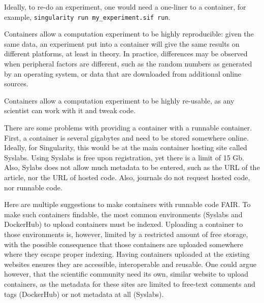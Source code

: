 Ideally, to re-do an experiment, one would need a one-liner to a container,
for example, \verb|singularity run my_experiment.sif run|.


Containers allow a computation experiment to be highly reproducible:
given the same data, an experiment put into a container will give
the same results on different platforms, at least in theory.
In practice, differences may be observed when peripheral factors
are different, such as the random numbers as generated by an operating
system, or data that are downloaded from additional online sources.


Containers allow a computation experiment to be highly re-usable,
as any scientist can work with it and tweak code.


There are some problems with providing a container with a runnable container.
First, a container is several gigabytes and need to be stored somewhere
online. 
Ideally, for Singularity, this would be at the main container hosting
site called Syslabs. Using Syslabs is free upon registration, 
yet there is a limit of 15 Gb. Also, Sylabs does not allow much metadata to
be entered, such as the URL of the article, nor the URL of hosted code.
Also, journals do not request hosted code, nor runnable code.


Here are multiple suggestions to make containers with runnable code FAIR.
To make such containers findable, the most common 
environments (Syslabs and DockerHub) to upload containers must be indexed.
Uploading a container to those environments is, however, limited by
a restricted amount of free storage, with the possible consequence that
those containers are uploaded somewhere where they escape proper indexing.
Having containers uploaded at the existing websites ensures they are
accessible, interoperable and reusable.
One could argue however, that the scientific community need its own,
similar website to upload containers, as the metadata for these
sites are limited to free-text comments and tags (DockerHub)
or not metadata at all (Syslabs).

